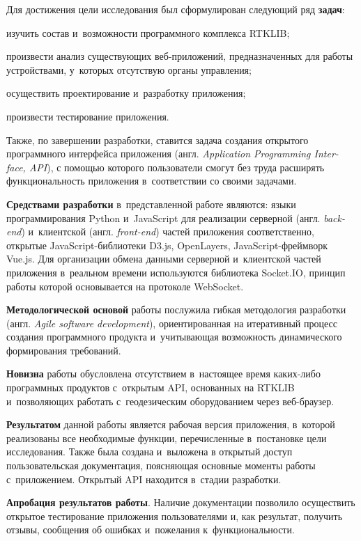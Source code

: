 Для достижения цели исследования был сформулирован следующий ряд \textbf{задач}:

\begin{dashitemize}
  \item изучить состав и~возможности программного комплекса RTKLIB;
  \item произвести анализ существующих веб-приложений, предназначенных для работы устройствами, у~которых отсутствую органы управления;
  \item осуществить проектирование и~разработку приложения;
  \item произвести тестирование приложения.
\end{dashitemize}

Также, по завершении разработки, ставится задача создания открытого программного интерфейса приложения (англ. \emph{Application Programming Inter-face, API}), с помощью которого пользователи смогут без труда расширять функциональность приложения в~соответствии со своими задачами. \par

\textbf{Средствами разработки} в~представленной работе являются: языки программирования Python и~JavaScript для реализации серверной (англ. \emph{back-end}) и~клиентской (англ. \emph{front-end}) частей приложения соответственно, открытые JavaScript-библиотеки D3.js, OpenLayers, JavaScript-фреймворк Vue.js. Для организации обмена данными серверной и~клиентской частей приложения в~реальном времени используются библиотека Socket.IO, принцип работы которой основывается на протоколе WebSocket. \par

\textbf{Методологической основой} работы послужила гибкая методология разработки (англ. \emph{Agile software development}), ориентированная на итеративный процесс создания программного продукта и~учитывающая возможность динамического формирования требований. \par

\textbf{Новизна} работы обусловлена отсутствием в~настоящее время каких-либо программных продуктов с~открытым API, основанных на RTKLIB и~позволяющих работать с~геодезическим оборудованием через веб-браузер. \par

\textbf{Результатом} данной работы является рабочая версия приложения, в~которой реализованы все необходимые функции, перечисленные в~постановке цели исследования. Также была создана и~выложена в открытый доступ пользовательская документация, поясняющая основные моменты работы с~приложением. Открытый API находится в~стадии разработки. \par

\textbf{Апробация результатов работы}. Наличие документации позволило осуществить открытое тестирование приложения пользователями и, как результат, получить отзывы, сообщения об ошибках и~пожелания к~функциональности. \par


\newpage
